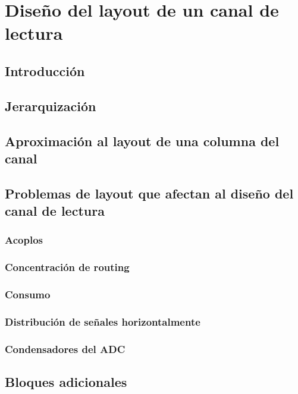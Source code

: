 \documentclass[12pt,a4paper,oneside,titlepage]{report}
\begin{document}
\chapter{Diseño del layout de un canal de lectura}

\section{Introducción}

\section{Jerarquización}

\section{Aproximación al layout de una columna del canal}

\section{Problemas de layout que afectan al diseño del canal de lectura}

\subsection{Acoplos}

\subsection{Concentración de routing}

\subsection{Consumo}

\subsection{Distribución de señales horizontalmente}

\subsection{Condensadores del ADC}

\section{Bloques adicionales}
\end{document}
